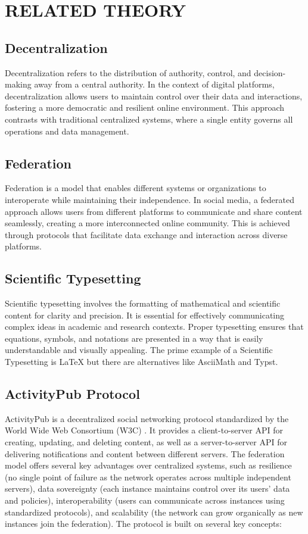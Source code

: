 \chapter{RELATED THEORY}

\section{Decentralization}
Decentralization refers to the distribution of authority, control, and decision-making away from a central authority. In the context of digital platforms, decentralization allows users to maintain control over their data and interactions, fostering a more democratic and resilient online environment. This approach contrasts with traditional centralized systems, where a single entity governs all operations and data management. 

\section{Federation}
Federation is a model that enables different systems or organizations to interoperate while maintaining their independence. In social media, a federated approach allows users from different platforms to communicate and share content seamlessly, creating a more interconnected online community. This is achieved through protocols that facilitate data exchange and interaction across diverse platforms.

\section{Scientific Typesetting}
Scientific typesetting involves the formatting of mathematical and scientific content for clarity and precision. It is essential for effectively communicating complex ideas in academic and research contexts. Proper typesetting ensures that equations, symbols, and notations are presented in a way that is easily understandable and visually appealing. The prime example of a Scientific Typesetting is LaTeX but there are alternatives like AsciiMath and Typst.

\section{ActivityPub Protocol}
ActivityPub is a decentralized social networking protocol standardized by the World Wide Web Consortium (W3C) \cite{ActivityPub}. It provides a client-to-server API for creating, updating, and deleting content, as well as a server-to-server API for delivering notifications and content between different servers. The federation model offers several key advantages over centralized systems, such as resilience (no single point of failure as the network operates across multiple independent servers), data sovereignty (each instance maintains control over its users' data and policies), interoperability (users can communicate across instances using standardized protocols), and scalability (the network can grow organically as new instances join the federation). The protocol is built on several key concepts:

